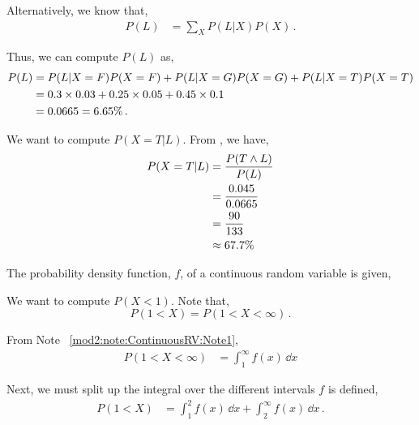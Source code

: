 \begin{subquestions}
\begin{subsubquestions}
Alternatively, we know that,
\begin{align}
	P(L)&= \sum_{X} P(L|X) P(X)\,.
\end{align}

Thus, we can compute $P(L)$ as,
\begin{align}
	P(L)&= P(L|X=F) P(X=F) + P(L|X=G) P(X=G)+ P(L|X=T) P(X=T) \nonumber\\
	&=0.3 \times 0.03 +  0.25 \times 0.05 + 0.45 \times 0.1 \nonumber\\
	&=  0.0665 = 6.65\% \,.		
\end{align}


\subsubquestion

We want to compute $P(X=T| L)$. From , we have,
\begin{align}
	P(X=T| L) & = \frac{P(T \land L)}{P(L)} \nonumber \\
	                      & = \frac{0.045}{0.0665} \nonumber \\
	                      & = \frac{90}{133} \nonumber \\ 
	                      & \approx 67.7\%
\end{align}

\end{subsubquestions}


\subquestion

The probability density function, $f$, of a continuous random variable is given,
\begin{subsubquestions}
	
\subsubquestion

We want to compute $P(X<1)$. Note that,
\begin{equation}
	P(1<X) = P(1<X<\infty) \,.
\end{equation}

From Note ~\ref{mod2:note:ContinuousRV:Note1},
\begin{align}
	 P(1<X<\infty) & = \int_{1}^{\infty}f(x)\,\dd x
\end{align}

Next, we must split up the integral over the different intervals $f$ is defined,
\begin{align}
P(1<X) & = \int_{1}^{2}f(x)\,\dd x+\int_{2}^{\infty}f(x)\,\dd x \,.
\end{align}


\end{subsubquestions}
\end{subquestions}
